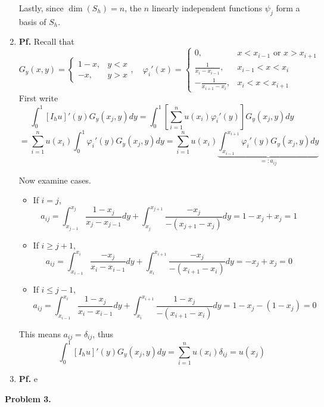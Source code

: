 \documentclass{article}
\def\tbf#1{\textbf{#1}}
\newcommand{\sbr}[1]{\left[#1\right]}
\newcommand{\vp}{\varphi}
\newcommand{\pf}{\tbf{Pf. }}
\begin{document}
\begin{enumerate}[label=(\alph*)]
Lastly, since $\dim(S_h)=n$, the $n$ linearly independent functions $\psi_j$ form a basis of $S_h$.


\item \pf Recall that
$$G_y(x,y) =
\begin{cases}
	1-x, & y<x\\
	-x, & y>x
\end{cases},
\quad \vp_i'(x) =
\begin{cases}
	0, & x<x_{i-1} \text{ or } x>x_{i+1}\\
	\frac{1}{x_i-x_{i-1}}, & x_{i-1}<x<x_i\\
	-\frac{1}{x_{i+1}-x_i}, & x_i<x<x_{i+1}
\end{cases}$$
First write
$$\int_0^1 [I_hu]'(y)G_y(x_j,y)dy
= \int_0^1 \sbr{\sum_{i=1}^n u(x_i)\vp_i'(y)}G_y(x_j,y)dy$$
$$= \sum_{i=1}^n u(x_i)\int_0^1 \vp_i'(y)G_y(x_j,y)dy
= \sum_{i=1}^n u(x_i)\underbrace{\int_{x_{i-1}}^{x_{i+1}} \vp_i'(y)G_y(x_j,y)dy}_{=:a_{ij}}$$

Now examine cases.
\begin{itemize}
	
	\item If $i=j$,
	$$a_{ij} = \int_{x_{j-1}}^{x_j}\frac{1-x_j}{x_j-x_{j-1}}dy + \int_{x_j}^{x_{j+1}}\frac{-x_j}{-(x_{j+1}-x_j)}dy
	= 1 - x_j + x_j
	= 1$$
	
	\item If $i\ge j+1$,
	$$a_{ij} = \int_{x_{i-1}}^{x_i}\frac{-x_j}{x_i-x_{i-1}}dy + \int_{x_i}^{x_{i+1}}\frac{-x_j}{-(x_{i+1}-x_i)}dy
	= -x_j + x_j
	= 0$$
	
	\item If $i\le j-1$,
	$$a_{ij} = \int_{x_{i-1}}^{x_i}\frac{1-x_j}{x_i-x_{i-1}}dy + \int_{x_i}^{x_{i+1}}\frac{1-x_j}{-(x_{i+1}-x_i)}dy
	= 1 - x_j - (1 - x_j)
	= 0$$	
	
\end{itemize}
This means $a_{ij}=\delta_{ij}$, thus
$$\int_0^1 [I_hu]'(y)G_y(x_j,y)dy = \sum_{i=1}^n u(x_i)\delta_{ij} = u(x_j)$$


\item \pf e
	
\end{enumerate}



\tbf{Problem 3.}
\end{document}
